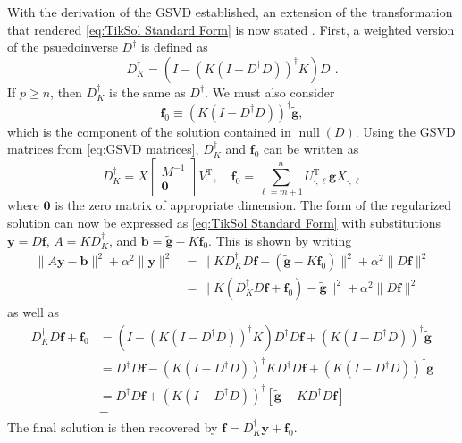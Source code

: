 \documentclass[12pt]{article}
\newcommand{\gnoiseVec}{\widetilde{\mathbf{g}}}	%
\newcommand{\kMat}{K}	%
\newcommand{\fVec}{\mathbf{f}}	%
\newcommand{\trans}{\mathrm{T}}	%
\DeclareMathOperator{\nullspace}{null}	%
\newcommand{\regparam}{\alpha}
\begin{document}
With the derivation of the GSVD established, an extension of the transformation that rendered \eqref{eq:TikSol Standard Form} is now stated \cite[p.~38]{Hansen:98}. First, a weighted version of the psuedoinverse $D^\dagger$ is defined as
\[D_{\kMat}^\dagger = \left(I - \left(\kMat\left(I - D^\dagger D\right)\right)^\dagger \kMat\right)D^\dagger.\]
If $p \geq n$, then $D_{\kMat}^\dagger$ is the same as $D^\dagger$. We must also consider
\[\fVec_0 \equiv \left(\kMat\left(I - D^\dagger D\right)\right)^\dagger \gnoiseVec,\]
which is the component of the solution contained in $\nullspace(D)$.  Using the GSVD matrices from \eqref{eq:GSVD matrices}, $D_{\kMat}^\dagger$ and $\fVec_0$ can be written as
\begin{equation}
\label{eq:Trans. 1}
D_{\kMat}^\dagger = X \begin{bmatrix}
M^{-1} \\
\mathbf{0}
\end{bmatrix}V^\trans, \quad \fVec_0 = \sum_{\ell=m+1}^{n} U_{\cdot,\ell}^\trans\gnoiseVec X_{\cdot,\ell}
\end{equation}
where $\bm{0}$ is the zero matrix of appropriate dimension. The form of the regularized solution can now be expressed as \eqref{eq:TikSol Standard Form} with substitutions $\mathbf{y} = D\fVec$, $A = \kMat{D_{\kMat}^\dagger}$, and $\mathbf{b} = \gnoiseVec - \kMat\fVec_0$. This is shown by writing
\begin{align*}
\|A\mathbf{y} - \mathbf{b}\|^2 + \regparam^2\|\mathbf{y}\|^2 &= \|\kMat{D_{\kMat}^\dagger}D\fVec - (\gnoiseVec - \kMat\fVec_0)\|^2 + \regparam^2\|D\fVec\|^2 \\
&=  \|\kMat({D_{\kMat}^\dagger}D\fVec + \fVec_0) - \gnoiseVec\|^2 + \regparam^2\|D\fVec\|^2
\end{align*}
as well as 
\begin{align*}
{D_{\kMat}^\dagger}D\fVec + \fVec_0 &= \left(I - \left(\kMat\left(I - D^\dagger D\right)\right)^\dagger \kMat\right)D^\dagger D\fVec + \left(\kMat\left(I - D^\dagger D\right)\right)^\dagger \gnoiseVec \\
&= D^\dagger D\fVec - \left(\kMat\left(I - D^\dagger D\right)\right)^\dagger \kMat D^\dagger D\fVec + \left(\kMat\left(I - D^\dagger D\right)\right)^\dagger \gnoiseVec \\ 
&= D^\dagger D\fVec + \left(\kMat\left(I - D^\dagger D\right)\right)^\dagger \left[\gnoiseVec - \kMat D^\dagger D\fVec\right] \\
&= 
\end{align*}
The final solution is then recovered by $\fVec = D_{\kMat}^\dagger \mathbf{y} + \fVec_0$. \newpage
\end{document}

